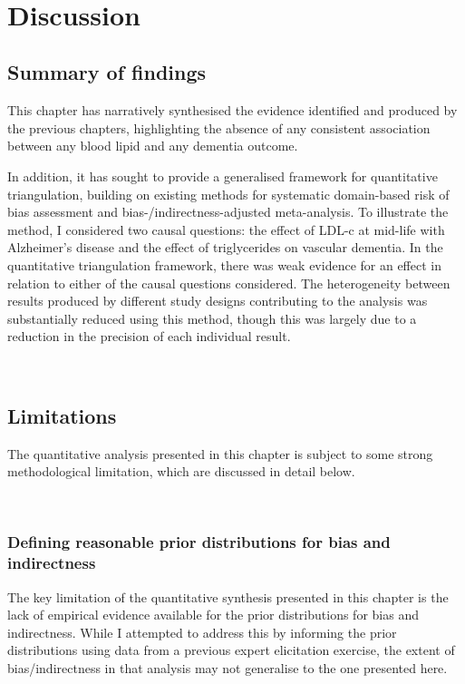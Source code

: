 \documentclass[a4paper, twoside]{templates/ociamthesis}
\begin{document}
~

\hypertarget{discussion-4}{%
\section{Discussion}\label{discussion-4}}

\hypertarget{summary-of-findings-3}{%
\subsection{Summary of findings}\label{summary-of-findings-3}}

This chapter has narratively synthesised the evidence identified and produced by the previous chapters, highlighting the absence of any consistent association between any blood lipid and any dementia outcome.

In addition, it has sought to provide a generalised framework for quantitative triangulation, building on existing methods for systematic domain-based risk of bias assessment and bias-/indirectness-adjusted meta-analysis. To illustrate the method, I considered two causal questions: the effect of LDL-c at mid-life with Alzheimer's disease and the effect of triglycerides on vascular dementia. In the quantitative triangulation framework, there was weak evidence for an effect in relation to either of the causal questions considered. The heterogeneity between results produced by different study designs contributing to the analysis was substantially reduced using this method, though this was largely due to a reduction in the precision of each individual result.

~

\hypertarget{limitations-2}{%
\subsection{Limitations}\label{limitations-2}}

The quantitative analysis presented in this chapter is subject to some strong methodological limitation, which are discussed in detail below.

~

\hypertarget{tri-prior-def}{%
\subsubsection{Defining reasonable prior distributions for bias and indirectness}\label{tri-prior-def}}

The key limitation of the quantitative synthesis presented in this chapter is the lack of empirical evidence available for the prior distributions for bias and indirectness. While I attempted to address this by informing the prior distributions using data from a previous expert elicitation exercise, the extent of bias/indirectness in that analysis may not generalise to the one presented here.
\end{document}
